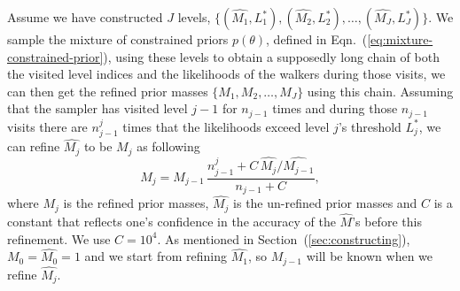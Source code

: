 \documentclass[letterpaper, preprint]{aastex}
\newcommand{\qer}[1]{{\color{red}#1}}
\begin{document}
Assume we have constructed $J$ levels, $\{(\widehat{M_1},L_1^*),(\widehat{M_2},L_2^*), \ldots,(\widehat{M_J},L_J^*)\}$. We sample the mixture of constrained priors $p(\theta)$, defined in Eqn.~(\ref{eq:mixture-constrained-prior}), using these levels to obtain a supposedly long chain of both the visited level indices and the likelihoods of the walkers during those visits, we can then get the refined prior masses $\{M_1,M_2,\dots,M_J\}$ using this chain. Assuming that the sampler has visited level $j-1$ for $n_{j-1}$ times and during those $n_{j-1}$ visits there are $n_{j-1}^j$ times that the likelihoods exceed level $j$'s threshold $L^*_j$, we can refine $\widehat{M_j}$ to be $M_j$ as following \citep{brewer11a}
\begin{equation}
M_j = M_{j-1} \, \frac{n_{j-1}^j+C \,  \widehat{M_j}/\widehat{M_{j-1}}}{n_{j-1}+C},
\label{eq:refinement}
\end{equation}
where $M_j$ is the refined prior masses, $\widehat{M_j}$ is the un-refined prior masses and $C$ is a constant that reflects one's confidence in the accuracy of the $\widehat{M}$'s before this refinement. \qer{We use $C=10^4$.} As mentioned in Section~(\ref{sec:constructing}), $M_0=\widehat{M_0}=1$ and we start from refining $\widehat{M_1}$, so $M_{j-1}$ will be known when we refine $\widehat{M_j}$. 
\end{document}
